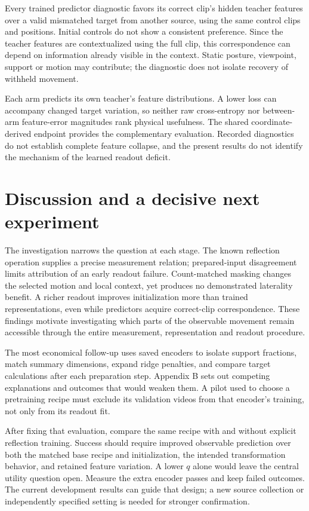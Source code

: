 \documentclass{article}
\begin{document}
Every trained predictor diagnostic favors its correct clip's hidden teacher features over a valid mismatched target from another source, using the same control clips and positions. Initial controls do not show a consistent preference. Since the teacher features are contextualized using the full clip, this correspondence can depend on information already visible in the context. Static posture, viewpoint, support or motion may contribute; the diagnostic does not isolate recovery of withheld movement.

Each arm predicts its own teacher's feature distributions. A lower loss can accompany changed target variation, so neither raw cross-entropy nor between-arm feature-error magnitudes rank physical usefulness. The shared coordinate-derived endpoint provides the complementary evaluation. Recorded diagnostics do not establish complete feature collapse, and the present results do not identify the mechanism of the learned readout deficit.

\section{Discussion and a decisive next experiment}\label{discussion-and-a-decisive-next-experiment}

The investigation narrows the question at each stage. The known reflection operation supplies a precise measurement relation; prepared-input disagreement limits attribution of an early readout failure. Count-matched masking changes the selected motion and local context, yet produces no demonstrated laterality benefit. A richer readout improves initialization more than trained representations, even while predictors acquire correct-clip correspondence. These findings motivate investigating which parts of the observable movement remain accessible through the entire measurement, representation and readout procedure.

The most economical follow-up uses saved encoders to isolate support fractions, match summary dimensions, expand ridge penalties, and compare target calculations after each preparation step. Appendix B sets out competing explanations and outcomes that would weaken them. A pilot used to choose a pretraining recipe must exclude its validation videos from that encoder's training, not only from its readout fit.

After fixing that evaluation, compare the same recipe with and without explicit reflection training. Success should require improved observable prediction over both the matched base recipe and initialization, the intended transformation behavior, and retained feature variation. A lower \(q\) alone would leave the central utility question open. Measure the extra encoder passes and keep failed outcomes. The current development results can guide that design; a new source collection or independently specified setting is needed for stronger confirmation.
\end{document}
